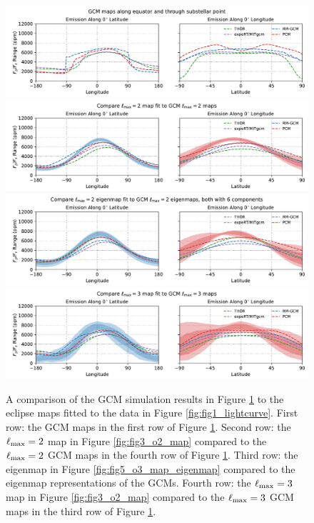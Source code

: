 \documentclass[twocolumn]{aastex631}
\begin{document}
\begin{figure}[!t]
    \label{fig:fig7_gcm_maps}
\end{figure}

\begin{figure}[!t]
    \centering
    \includegraphics[width=\textwidth]{fig8a_compare_gcm_obs_o2.pdf}
    \includegraphics[width=\textwidth]{fig8b_compare_gcm_o2_obs_o2.pdf}
    \includegraphics[width=\textwidth]{fig8c_compare_gcm_obs_eigen.pdf}    \includegraphics[width=\textwidth]{fig8d_compare_gcm_o3_obs_o3.pdf}
    \caption{A comparison of the GCM simulation results in Figure \ref{fig:fig7_gcm_maps} to the eclipse maps fitted to the data in Figure \ref{fig:fig1_lightcurve}. First row: the GCM maps in the first row of Figure \ref{fig:fig7_gcm_maps}. Second row: the $\ell_{\rm max}=2$ map in Figure \ref{fig:fig3_o2_map} compared to the $\ell_{\rm max}=2$ GCM maps in the fourth row of Figure \ref{fig:fig7_gcm_maps}. Third row: the eigenmap in Figure \ref{fig:fig5_o3_map_eigenmap} compared to the eigenmap representations of the GCMs. Fourth row: the $\ell_{\rm max}=3$ map in Figure \ref{fig:fig3_o2_map} compared to the $\ell_{\rm max}=3$ GCM maps in the third row of Figure \ref{fig:fig7_gcm_maps}.}
    \label{fig:fig8_compare_gcm_obs}
\end{figure}
\end{document}
